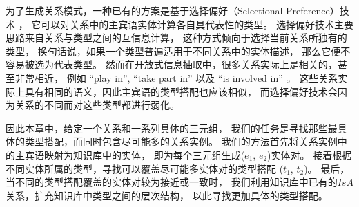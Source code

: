 
为了生成关系模式，一种已有的方案是基于选择偏好（Selectional Preference）技术
\cite{resnik1996selectional,erk2007simple,ritter2010latent}，
它可以对关系中的主宾语实体计算各自具代表性的类型。
选择偏好技术主要思路来自关系与类型之间的互信息计算\cite{erk2007simple}，
这种方式倾向于选择当前关系所独有的类型，
换句话说，如果一个类型普遍适用于不同关系中的实体描述，
那么它便不容易被选为代表类型。
然而在开放式信息抽取中，很多关系实际上是相关的，甚至非常相近，
例如 ``play in'', ``take part in'' 以及 ``is involved in'' 。
这些关系实际上具有相同的语义，因此主宾语的类型搭配也应该相似，
而选择偏好技术会因为关系的不同而对这些类型都进行弱化。

因此本章中，给定一个关系和一系列具体的三元组，
我们的任务是寻找那些最具体的类型搭配，而同时包含尽可能多的关系实例。
我们的方法首先将关系实例中的主宾语映射为知识库中的实体，
即为每个三元组生成($e_1$, $e_2$)实体对。
接着根据不同实体所属的类型，寻找可以覆盖尽可能多实体对的类型搭配
($t_1$, $t_2$)。
最后，当不同的类型搭配覆盖的实体对较为接近或一致时，
我们利用知识库中已有的$IsA$关系，扩充知识库中类型之间的层次结构，
以此寻找更加具体的类型搭配。


